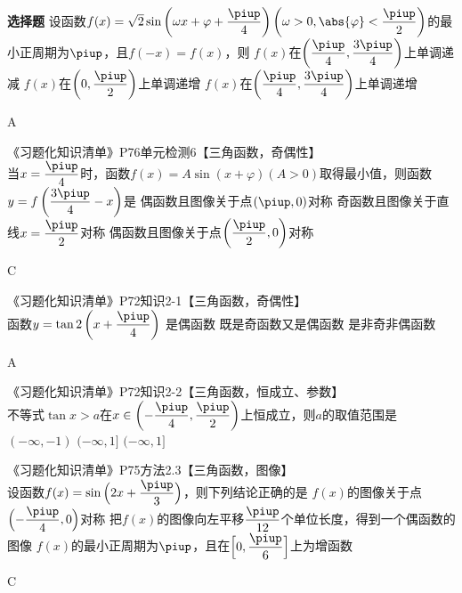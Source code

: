 \begin{exercise}{\bf 选择题}
      设函数$f(x)=\sqrt{2}\sin \left(\omega x+\varphi+\dfrac{\piup}4 \right)$$\left(\omega>0,\abs{\varphi}<\dfrac{\piup}2 \right)$的最小正周期为$\piup$，且$f(-x)=f(x)$，则\xz
        {$f(x)$在$\left(\dfrac{\piup}4,\dfrac{3\piup}4 \right)$上单调递减}
        {$f(x)$在$\left(0,\dfrac{\piup}2 \right)$上单调递增}
        {$f(x)$在$\left(\dfrac{\piup}4,\dfrac{3\piup}4 \right)$上单调递增}
      \begin{answer}
        A
      \end{answer}
    \item 《习题化知识清单》P76单元检测6【三角函数，奇偶性】\\
      当$x=\dfrac{\piup}4$时，函数$f(x)=A\sin(x+\varphi)(A>0)$取得最小值，则函数$y=f\left(\dfrac{3\piup}4-x \right)$是\xz
        {偶函数且图像关于点$\left(\piup,0 \right)$对称}
        {奇函数且图像关于直线$x=\dfrac{\piup}2$对称}
        {偶函数且图像关于点$\left(\dfrac{\piup}2,0 \right)$对称}
      \begin{answer}
        C
      \end{answer}
    \item 《习题化知识清单》P72知识2-1【三角函数，奇偶性】\\
      函数$y=\tan2\left(x+\dfrac{\piup}4 \right)$\xz
        {是偶函数}
        {既是奇函数又是偶函数}
        {是非奇非偶函数}
      \begin{answer}
        A
      \end{answer}
    \item 《习题化知识清单》P72知识2-2【三角函数，恒成立、参数】\\
      不等式$\tan x>a$在$x\in\left(-\dfrac{\piup}4,\dfrac{\piup}2 \right)$上恒成立，则$a$的取值范围是\xz
      \xx{$(-\infty,-1]$}
        {$(-\infty,-1)$}
        {$(-\infty,1]$}
        {$(-\infty,1]$}
    \item 《习题化知识清单》P75方法2.3【三角函数，图像】\\
      设函数$f(x)=\sin{\Bigl(2x+\dfrac{\piup}3\Bigr)}$，则下列结论正确的是\xz
        {$f(x)$的图像关于点$\Bigl(-\dfrac{\piup}4,0\Bigr)$对称}
        {把$f(x)$的图像向左平移$\dfrac{\piup}{12}$个单位长度，得到一个偶函数的图像}
        {$f(x)$的最小正周期为$\piup$，且在$\Bigl[0,\dfrac{\piup}6 \Bigr]
        $上为增函数}
      \begin{answer}
        C
      \end{answer}
$$
\end{exercise}
